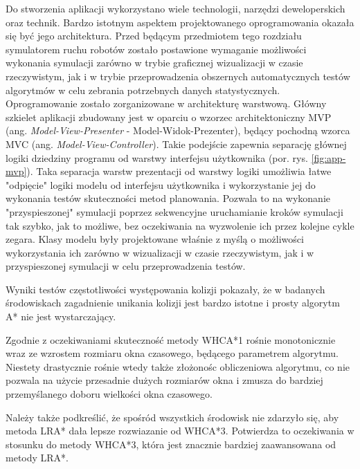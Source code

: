 Do stworzenia aplikacji wykorzystano wiele technologii, narzędzi deweloperskich oraz technik.
Bardzo istotnym aspektem projektowanego oprogramowania okazała się być jego architektura. Przed będącym przedmiotem tego rozdziału symulatorem ruchu robotów zostało postawione wymaganie możliwości wykonania symulacji zarówno w trybie graficznej wizualizacji w czasie rzeczywistym, jak i w trybie przeprowadzenia obszernych automatycznych testów algorytmów w celu zebrania potrzebnych danych statystycznych.
Oprogramowanie zostało zorganizowane w architekturę warstwową.
Główny szkielet aplikacji zbudowany jest w oparciu o wzorzec architektoniczny MVP (ang. {\it Model-View-Presenter} - Model-Widok-Prezenter), będący pochodną wzorca MVC (ang. {\it Model-View-Controller}).
Takie podejście zapewnia separację głównej logiki dziedziny programu od warstwy interfejsu użytkownika \cite{mvp} (por. rys. \ref{fig:app-mvp}).
Taka separacja warstw prezentacji od warstwy logiki umożliwia łatwe "odpięcie" logiki modelu od interfejsu użytkownika i wykorzystanie jej do wykonania testów skuteczności metod planowania. Pozwala to na wykonanie "przyspieszonej" symulacji poprzez sekwencyjne uruchamianie kroków symulacji tak szybko, jak to możliwe, bez oczekiwania na wyzwolenie ich przez kolejne cykle zegara.
Klasy modelu były projektowane właśnie z myślą o możliwości wykorzystania ich zarówno w wizualizacji w czasie rzeczywistym, jak i w przyspieszonej symulacji w celu przeprowadzenia testów.

Wyniki testów częstotliwości występowania kolizji pokazały, że w badanych środowiskach zagadnienie unikania kolizji jest bardzo istotne i prosty algorytm A* nie jest wystarczający.

Zgodnie z oczekiwaniami skuteczność metody WHCA*1 rośnie monotonicznie wraz ze wzrostem rozmiaru okna czasowego, będącego parametrem algorytmu.
Niestety drastycznie rośnie wtedy także złożonośc obliczeniowa algorytmu, co nie pozwala na użycie przesadnie dużych rozmiarów okna i zmusza do bardziej przemyślanego doboru wielkości okna czasowego.

Należy także podkreślić, że spośród wszystkich środowisk nie zdarzyło się, aby metoda LRA* dała lepsze rozwiazanie od WHCA*3.
Potwierdza to oczekiwania w stosunku do metody WHCA*3, która jest znacznie bardziej zaawansowana od metody LRA*.

